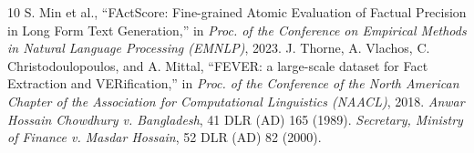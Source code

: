 \documentclass[conference]{IEEEtran}
\begin{document}
\begin{thebibliography}{10}
S. Min et al., ``FActScore: Fine-grained Atomic Evaluation of Factual Precision in Long Form Text Generation,'' in \textit{Proc. of the Conference on Empirical Methods in Natural Language Processing (EMNLP)}, 2023.
J. Thorne, A. Vlachos, C. Christodoulopoulos, and A. Mittal, ``FEVER: a large-scale dataset for Fact Extraction and VERification,'' in \textit{Proc. of the Conference of the North American Chapter of the Association for Computational Linguistics (NAACL)}, 2018.
\textit{Anwar Hossain Chowdhury v. Bangladesh}, 41 DLR (AD) 165 (1989).
\textit{Secretary, Ministry of Finance v. Masdar Hossain}, 52 DLR (AD) 82 (2000).
\end{thebibliography}
\end{document}
